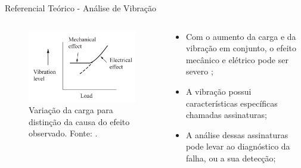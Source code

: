 \documentclass[aspectratio=169]{beamer}
\begin{document}
\begin{frame}{Referencial Teórico - Análise de Vibração}
	\begin{columns}
    	\begin{column}{0.50\textwidth}
			\begin{figure}[HT]
				\begin{center}
					\includegraphics[scale=.25]{../referencial/img/fault_effect_randall_p54.png}
					\caption{Variação da carga para distinção da causa do efeito observado. \newline
					Fonte: .} 
					\label{fig:fault_effect_randall_p54}
				\end{center}
			\end{figure}
     	\end{column}
		
		\begin{column}{0.5\textwidth}
			\begin{itemize}
				\item  Com o aumento da carga e da vibração em conjunto, o efeito mecânico e elétrico pode ser 
				severo ;
				\item A vibração possui características específicas chamadas assinaturas;
				\item A análise dessas assinaturas pode levar ao diagnóstico da falha, ou a sua detecção;
			\end{itemize}
	 	\end{column}
	 \end{columns}
\end{frame}

\end{document}
